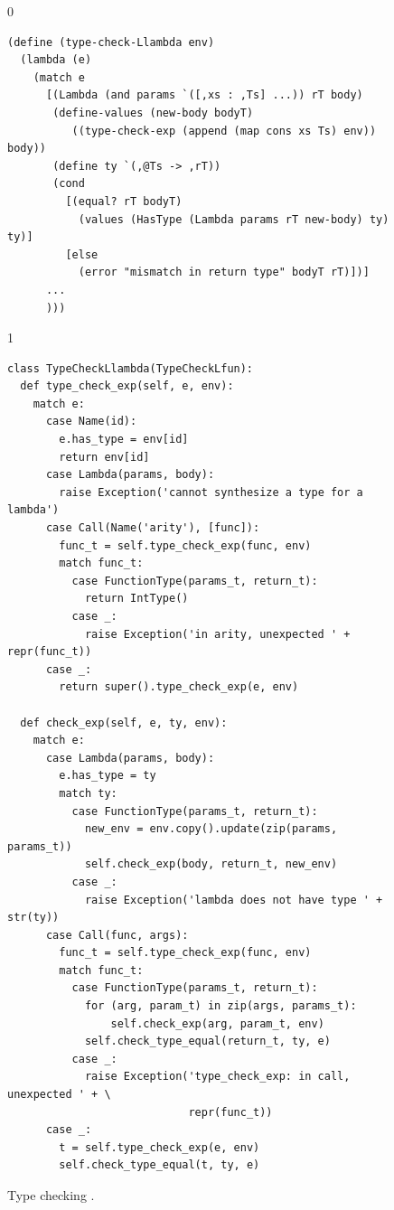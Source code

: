 \documentclass[7x10]{TimesAPriori_MIT}%
\def\racketEd{0}
\def\pythonEd{1}
\providecommand{\BookEdition}{1}
\let\edition\BookEdition
\newcommand{\pythonColor}[0]{}
\newcommand{\python}[1]{{\if\edition\pythonEd\pythonColor #1\fi}}
\numberwithin{theorem}{chapter}
\numberwithin{definition}{chapter}
\numberwithin{equation}{chapter}
\begin{document}
\begin{figure}[tbp]
  \begin{tcolorbox}[colback=white]
    {\if\edition\racketEd 
\begin{lstlisting}
(define (type-check-Llambda env)
  (lambda (e)
    (match e
      [(Lambda (and params `([,xs : ,Ts] ...)) rT body)
       (define-values (new-body bodyT) 
          ((type-check-exp (append (map cons xs Ts) env)) body))
       (define ty `(,@Ts -> ,rT))
       (cond
         [(equal? rT bodyT)
           (values (HasType (Lambda params rT new-body) ty) ty)]
         [else
           (error "mismatch in return type" bodyT rT)])]
      ...
      )))
\end{lstlisting}
\fi}
{\if\edition\pythonEd\pythonColor 
\begin{lstlisting}
class TypeCheckLlambda(TypeCheckLfun):
  def type_check_exp(self, e, env):
    match e:
      case Name(id):
        e.has_type = env[id]
        return env[id]
      case Lambda(params, body):
        raise Exception('cannot synthesize a type for a lambda')
      case Call(Name('arity'), [func]):
        func_t = self.type_check_exp(func, env)
        match func_t:
          case FunctionType(params_t, return_t):
            return IntType()
          case _:
            raise Exception('in arity, unexpected ' + repr(func_t))
      case _:
        return super().type_check_exp(e, env)
    
  def check_exp(self, e, ty, env):
    match e:
      case Lambda(params, body):
        e.has_type = ty
        match ty:
          case FunctionType(params_t, return_t):
            new_env = env.copy().update(zip(params, params_t))
            self.check_exp(body, return_t, new_env)
          case _:
            raise Exception('lambda does not have type ' + str(ty))
      case Call(func, args):
        func_t = self.type_check_exp(func, env)
        match func_t:
          case FunctionType(params_t, return_t):
            for (arg, param_t) in zip(args, params_t):
                self.check_exp(arg, param_t, env)
            self.check_type_equal(return_t, ty, e)
          case _:
            raise Exception('type_check_exp: in call, unexpected ' + \
                            repr(func_t))
      case _:
        t = self.type_check_exp(e, env)
        self.check_type_equal(t, ty, e)
\end{lstlisting}
\fi}
  \end{tcolorbox}

  \caption{Type checking \LangLam{}\python{, part 1}.}
\label{fig:type-check-Llambda}
\end{figure}
\end{document}

